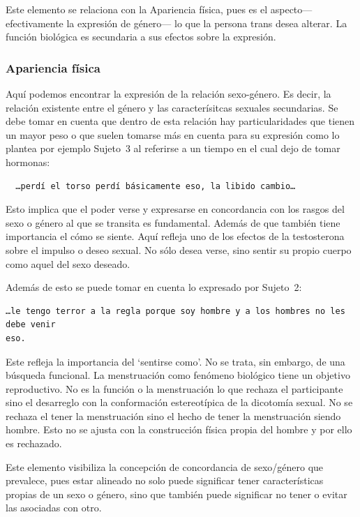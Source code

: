Este elemento se relaciona con la Apariencia física, pues es el aspecto—
efectivamente la expresión de género— lo que la persona trans desea alterar. La
función biológica es secundaria a sus efectos sobre la expresión.

\subsubsection{Apariencia física}

Aquí podemos encontrar la expresión de la relación sexo-género. Es decir, la
relación existente entre el género y las caracterísitcas sexuales secundarias.
Se debe tomar en cuenta que dentro de esta relación hay particularidades que
tienen un mayor peso o que suelen tomarse más en cuenta para su expresión como
lo plantea por ejemplo Sujeto~3 al referirse a un tiempo en el cual dejo de
tomar hormonas:

\begin{verbatim}
  …perdí el torso perdí básicamente eso, la libido cambio…
\end{verbatim}

Esto implica que el poder verse y expresarse en concordancia con los rasgos del
sexo o género al que se transita es fundamental. Además de que también tiene
importancia el cómo se siente. Aquí refleja uno de los efectos de la
testosterona sobre el impulso o deseo sexual. No sólo desea verse, sino sentir
su propio cuerpo como aquel del sexo deseado.

Además de esto se puede tomar en cuenta lo expresado por Sujeto~2:

\begin{verbatim}
…le tengo terror a la regla porque soy hombre y a los hombres no les debe venir
eso.
\end{verbatim}

Este refleja la importancia del ‘sentirse como’. No se trata, sin embargo, de
una búsqueda funcional. La menstruación como fenómeno biológico tiene un
objetivo reproductivo. No es la función o la menstruación lo que rechaza el
participante sino el desarreglo con la conformación estereotípica de la
dicotomía sexual. No se rechaza el tener la menstruación sino el hecho de tener
la menstruación siendo hombre. Esto no se ajusta con la construcción física
propia del hombre y por ello es rechazado.

Este elemento visibiliza la concepción de concordancia de sexo/género que
prevalece, pues estar alineado no solo puede significar tener características
propias de un sexo o género, sino que también puede significar no tener o evitar
las asociadas con otro.

